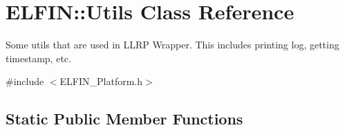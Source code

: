 \hypertarget{class_e_l_f_i_n_1_1_utils}{\section{E\-L\-F\-I\-N\-:\-:Utils Class Reference}
\label{class_e_l_f_i_n_1_1_utils}
}


Some utils that are used in L\-L\-R\-P Wrapper. This includes printing log, getting timestamp, etc.  




{\ttfamily \#include $<$E\-L\-F\-I\-N\-\_\-\-Platform.\-h$>$}

\subsection*{Static Public Member Functions}
